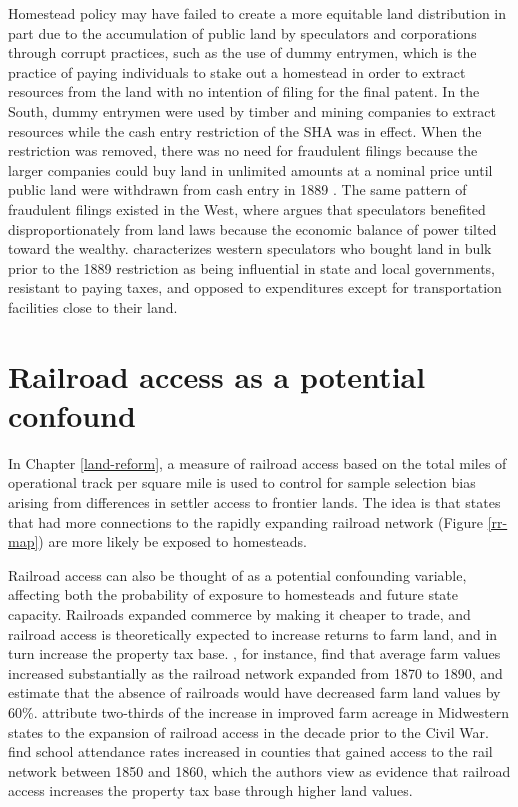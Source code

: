 Homestead policy may have failed to create a more equitable land distribution in part due to the accumulation of public land by speculators and corporations through corrupt practices, such as the use of dummy entrymen, which is the practice of paying individuals to stake out a homestead in order to extract resources from the land with no intention of filing for the final patent. In the South, dummy entrymen were used by timber and mining companies to extract resources while the cash entry restriction of the SHA was in effect. When the restriction was removed, there was no need for fraudulent filings because the larger companies could buy land in unlimited amounts at a nominal price until public land were withdrawn from cash entry in 1889 \citep{gates1940federal,gates1979federal}. The same pattern of fraudulent filings existed in the West, where \citet{murtazashvili2013political} argues that speculators benefited disproportionately from land laws because the economic balance of power tilted toward the wealthy. \citet{gates1942role} characterizes western speculators who bought land in bulk prior to the 1889 restriction as being influential in state and local governments, resistant to paying taxes, and opposed to expenditures except for transportation facilities close to their land.

\section{Railroad access as a potential confound} 

In Chapter \ref{land-reform}, a measure of railroad access based on the total miles of operational track per square mile is used to control for sample selection bias arising from differences in settler access to frontier lands. The idea is that states that had more connections to the rapidly expanding railroad network (Figure \ref{rr-map}) are more likely be exposed to homesteads. 

Railroad access can also be thought of as a potential confounding variable, affecting both the probability of exposure to homesteads and future state capacity. Railroads expanded commerce by making it cheaper to trade, and railroad access is theoretically expected to increase returns to farm land, and in turn increase the property tax base. \citet{donaldson2016railroads}, for instance, find that average farm values increased substantially as the railroad network expanded from 1870 to 1890, and estimate that the absence of railroads would have decreased farm land values by 60\%. \citet{atack2011impact} attribute two-thirds of the increase in improved farm acreage in Midwestern states to the expansion of railroad access in the decade prior to the Civil War. \citet{atack2012impact} find school attendance rates increased in counties that gained access to the rail network between 1850 and 1860, which the authors view as evidence that railroad access increases the property tax base through higher land values.

